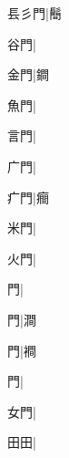 \begin{multicols}{2}
{{\cjk{}镸彡門}\mktsJzrVerticalBar{}{\cjk{}{\cnsym{}　}{\cnsym{}　}{\cnsym{}　}}|{\cjk{}鬝}\par
{\cjk{}{\cnsym{}　}谷門}\mktsJzrVerticalBar{}{\cjk{}{\cnsym{}　}{\cnsym{}　}{\cnsym{}　}}|{}\par
{\cjk{}{\cnsym{}　}金門}\mktsJzrVerticalBar{}{\cjk{}{\cnsym{}　}{\cnsym{}　}{\cnsym{}　}}|{\cjk{}鐧}\par
{\cjk{}{\cnsym{}　}魚門}\mktsJzrVerticalBar{}{\cjk{}{\cnsym{}　}{\cnsym{}　}{\cnsym{}　}}|{}\par
{\cjk{}{\cnsym{}　}言門}\mktsJzrVerticalBar{}{\cjk{}{\cnsym{}　}{\cnsym{}　}{\cnsym{}　}}|{}\par
{\cjk{}{\cnsym{}　}广門}\mktsJzrVerticalBar{}{\cjk{}{\cnsym{}　}{\cnsym{}　}{\cnsym{}　}}|{}\par
{\cjk{}{\cnsym{}　}疒門}\mktsJzrVerticalBar{}{\cjk{}{\cnsym{}　}{\cnsym{}　}{\cnsym{}　}}|{\cjk{}癎}\par
{\cjk{}{\cnsym{}　}米門}\mktsJzrVerticalBar{}{\cjk{}{\cnsym{}　}{\cnsym{}　}{\cnsym{}　}}|{}\par
{\cjk{}{\cnsym{}　}火門}\mktsJzrVerticalBar{}{\cjk{}{\cnsym{}　}{\cnsym{}　}{\cnsym{}　}}|{}\par
{門}\mktsJzrVerticalBar{}{\cjk{}{\cnsym{}　}{\cnsym{}　}{\cnsym{}　}}|{}\par
{門}\mktsJzrVerticalBar{}{\cjk{}{\cnsym{}　}{\cnsym{}　}{\cnsym{}　}}|{\cjk{}澗}\par
{門}\mktsJzrVerticalBar{}{\cjk{}{\cnsym{}　}{\cnsym{}　}{\cnsym{}　}}|{\cjk{}襇}\par
{門}\mktsJzrVerticalBar{}{\cjk{}{\cnsym{}　}{\cnsym{}　}{\cnsym{}　}}|{}\par
{\cjk{}{\cnsym{}　}女門}\mktsJzrVerticalBar{}{\cjk{}{\cnsym{}　}{\cnsym{}　}{\cnsym{}　}}|{}\par
{田田}\mktsJzrVerticalBar{}{\cjk{}{\cnsym{}　}{\cnsym{}　}{\cnsym{}　}}|{}\par
}
\end{multicols}
